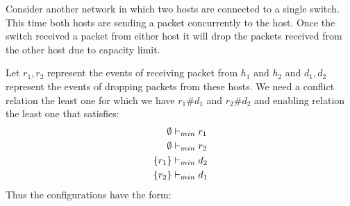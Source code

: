 \begin{example}
    Consider another network in which two hosts are connected
    to a single switch.
    This time both hosts are sending a packet concurrently to the
    host.
    Once the switch received a packet from either host it will
    drop the packets received from the other host due to capacity
    limit.
    \begin{center}
    \end{center}
    Let $r_1,r_2$ represent the events of receiving packet from
    $h_1$ and $h_2$ and $d_1,d_2$ represent the events of dropping
    packets from these hosts.
    We need a conflict relation the least one for which we have
    $r_1\#d_1$ and $r_2\#d_2$
    and enabling relation the least one that satisfies:
    \begin{align*}
        \emptyset & \vdash_{min} r_1 \\
        \emptyset & \vdash_{min} r_2 \\
        \{r_1\}   & \vdash_{min} d_2 \\
        \{r_2\}   & \vdash_{min} d_1 \\
    \end{align*}
    Thus the configurations have the form:
    \begin{center}
    \end{center}
\end{example}

